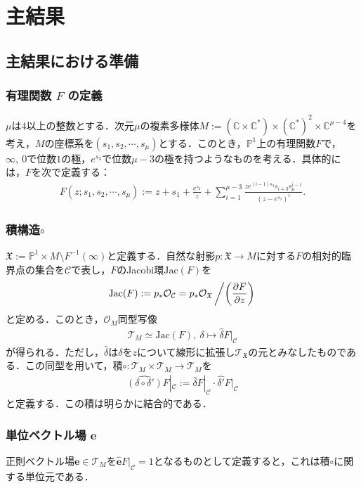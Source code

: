 \documentclass[a4paper,11pt]{jbook}
\theoremstyle{plain}
\theoremstyle{definition}
\theoremstyle{remark}
\theoremstyle{proof}
\numberwithin{equation}{section}
\def\CC{{\mathbb C}}
\def\PP{{\mathbb P}}
\def\C{{\mathcal C}}
\def\O{{\mathcal O}}
\def\T{{\mathcal T}}
\begin{document}
\chapter{主結果}

\section{主結果における準備}%

\subsection{有理関数 $F$ の定義}
	$\mu$は$4$以上の整数とする．次元$\mu$の複素多様体$M:=(\CC\times\CC^*)\times(\CC^*)^{2}\times\CC^{\mu-4}$を考え，$M$の座標系を$(s_1,s_2,\cdots,s_\mu)$とする．このとき，$\PP^1$上の有理関数$F$で，$\infty, \ 0$で位数$1$の極，$e^{s_3}$で位数$\mu-3$の極を持つようなものを考える．具体的には，$F$を次で定義する：
\begin{align}
F(z;s_1,s_2,\cdots,s_\mu) := z + s_1 +\frac{e^{s_2}}{z} + \sum_{i=1}^{\mu-3}\frac{ze^{(i-1)s_3}s_{i+3}s_{\mu}^{i-1}}{(z-e^{s_3})^i}. \label{eq:F}
\end{align}


\subsection{積構造$\circ$}%
	$\mathfrak{X}:=\PP^1\times M \setminus {F^{-1}(\infty)}$と定義する．自然な射影$p : \mathfrak{X} \rightarrow M$に対する$F$の相対的臨界点の集合を$\C$で表し，$F$のJacobi環$\mathrm{Jac}(F)$を
\begin{align}
	\mathrm{Jac}(F) := p_*\O_\C = p_*\O_\mathfrak{X} \left/ \left(\frac{\partial F}{\partial z}\right) \right.
\end{align}
と定める．このとき，$\O_M$同型写像
\begin{align}
	\T_M \simeq \mathrm{Jac}(F), \ \delta \mapsto \widehat{\delta} F|_\C
\end{align}
が得られる．ただし，$\widehat{\delta}$は$\delta$を$z$について線形に拡張し$\T_\mathfrak{X}$の元とみなしたものである．この同型を用いて，積$\circ : \T_M\times\T_M\rightarrow\T_M$を
\begin{align}
\widehat{(\delta\circ\delta')}F|_{\C}:=\widehat{\delta}F|_{\C}\cdot \widehat{\delta'}F|_{\C}
\end{align}
と定義する．この積は明らかに結合的である．

\subsection{単位ベクトル場 $\bm{e}$}%
	正則ベクトル場$\bm{e}\in \T_M$を$\widehat{\bm{e}}F|_\C = 1$となるものとして定義すると，これは積$\circ$に関する単位元である．
\end{document}
